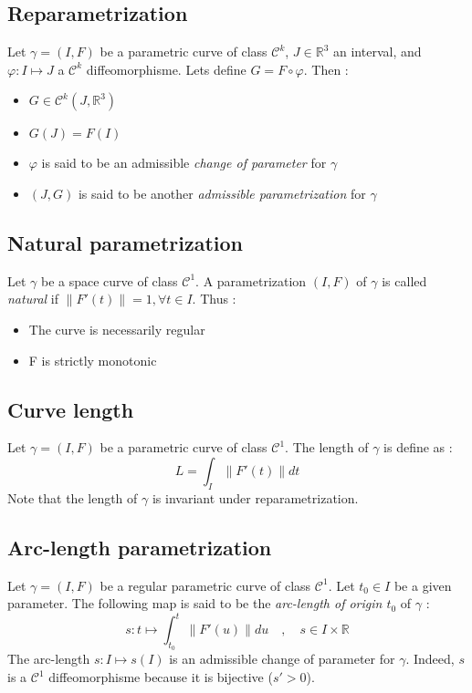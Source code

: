 \subsection{Reparametrization}
Let $\gamma=(I,F)$ be a parametric curve of class ${\mathcal{C}}^{k}$, $J \in {\mathbb{R}}^{3}$ an interval, and $\varphi\colon I\mapsto J$ a ${\mathcal{C}}^{k}$ diffeomorphisme. Lets define $G=F\circ\varphi$. Then :
\begin{itemize}
	\item $G\in{\mathcal{C}}^{k}(J,{\mathbb{R}}^3)$
	\item $G(J)=F(I)$
	\item $\varphi$ is said to be an admissible \emph{change of parameter} for $\gamma$
	\item  $(J,G)$ is said to be another \emph{admissible parametrization} for $\gamma$
\end{itemize}

\subsection{Natural parametrization}
Let $\gamma$ be a space curve of class ${\mathcal{C}}^{1}$. A parametrization $(I,F)$ of $\gamma$ is called \emph{natural} if $\|F'(t)\| = 1, \forall t \in I$. Thus :
\begin{itemize}
	\item The curve is necessarily regular
	\item F is strictly monotonic
\end{itemize}

\subsection{Curve length}
Let $\gamma=(I,F)$ be a parametric curve of class ${\mathcal{C}}^{1}$. The length of $\gamma$ is define as :
\begin{equation}
	L=\int_{I}\|F'(t)\|dt
\end{equation}
Note that the length of $\gamma$ is invariant under reparametrization.

\subsection{Arc-length parametrization}
Let $\gamma=(I,F)$ be a regular parametric curve of class ${\mathcal{C}}^{1}$. Let $t_0 \in I$ be a given parameter. The following map is said to be the \emph{arc-length of origin $t_0$} of $\gamma$ :
\begin{equation}
	s \colon t \mapsto \int_{t_{0}}^{t}\|F'(u)\|du
	\quad,\quad
	s \in I \times \mathbb{R}
\end{equation}
The arc-length $s \colon I\mapsto s(I)$ is an admissible change of parameter for $\gamma$. Indeed, $s$ is a ${\mathcal{C}}^{1}$ diffeomorphisme because it is bijective ($s'>0$).

